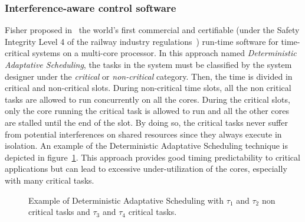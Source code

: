 \documentclass[main.tex]{subfiles}
\begin{document}
\subsubsection{Interference-aware control software}
Fisher proposed in~\cite{FisherWP} the world's first commercial and certifiable
(under the Safety Integrity Level 4 of the railway industry
regulations~\cite{IEC61508}) run-time software for time-critical systems on a
multi-core processor. In this approach named \emph{Deterministic Adaptative
Scheduling}, the tasks in the system must be classified by the system designer
under the \emph{critical} or \emph{non-critical} category. Then, the time is
divided in critical and non-critical slots. During non-critical time slots, all
the non critical tasks are allowed to run concurrently on all the cores. During
the critical slots, only the core running the critical task is allowed to run
and all the other cores are stalled until the end of the slot. By doing so, the
critical tasks never suffer from potential interferences on shared resources
since they always execute in isolation. An example of the Deterministic
Adaptative Scheduling technique is depicted in
figure~\ref{fig_stateOfTheArt_DeterAdaptSched}. This approach provides good
timing predictability to critical applications but can lead to excessive
under-utilization of the cores, especially with many critical tasks.\\


\begin{figure}
    \centering
    
    \caption{Example of Deterministic Adaptative Scheduling with $\tau_1$ and
    $\tau_2$ non critical tasks and $\tau_3$ and $\tau_4$ critical tasks.}
    \label{fig_stateOfTheArt_DeterAdaptSched}
\end{figure}
\end{document}
